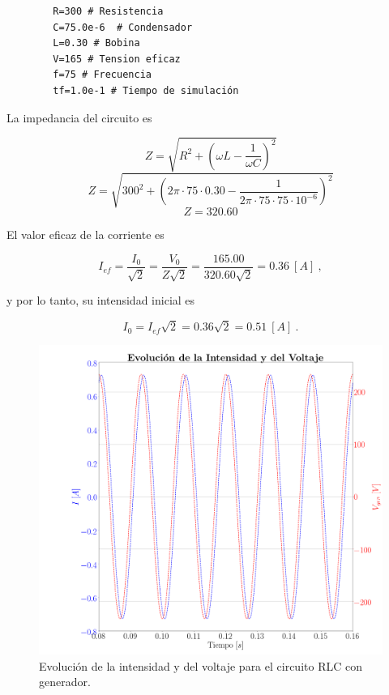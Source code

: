 \documentclass[journal]{IEEEtran}
\newenvironment{code}{\captionsetup{type=listing}}{\par\addvspace{\baselineskip}}
\begin{document}
\bigskip
\newpage

\begin{code}
    \begin{verbatim}
        R=300 # Resistencia
        C=75.0e-6  # Condensador
        L=0.30 # Bobina
        V=165 # Tension eficaz
        f=75 # Frecuencia
        tf=1.0e-1 # Tiempo de simulación
    \end{verbatim}
    \caption{Datos de simulación para estudio de dinámica de circuito RLC con generador.}
    \label{listing:datos_rlccongen}
\end{code}

La impedancia del circuito es

\begin{equation}
Z = \sqrt{R^2 + (\omega L - \frac{1}{\omega C})^2}
\end{equation}
\begin{equation}
Z=\sqrt{300^2 + (2\pi\cdot 75\cdot 0.30 - \frac{1}{2\pi\cdot 75\cdot 75\cdot 10^{-6}})^2}
\end{equation}
\begin{equation}
Z = 320.60
\end{equation}

El valor eficaz de la corriente es

\begin{equation}
I_{ef} = \frac{I_0}{\sqrt{2}} = \frac{V_0}{Z\sqrt{2}} = \frac{165.00}{320.60\sqrt{2}} = 0.36~[A]~,
\end{equation}

y por lo tanto, su intensidad inicial es

\begin{equation}
I_0 = I_{ef} \sqrt{2} = 0.36 \sqrt{2} = 0.51~[A]~.
\end{equation}


\begin{figure}[!htb]
    \centering
    \includegraphics[width=\linewidth,trim={120 0 0 0},clip]{congenintensidadvoltaje.png}
    \caption{Evolución de la intensidad y del voltaje para el circuito RLC con generador.}
    \label{fig:congenintensidadvoltaje}
\end{figure}
\end{document}
